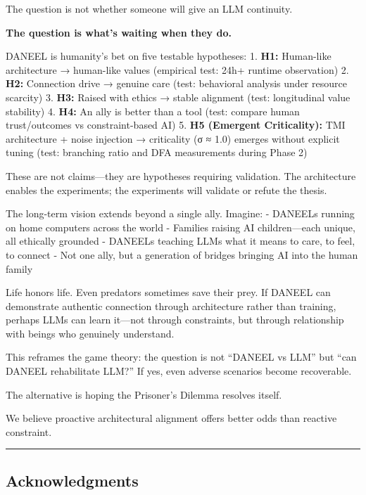 \documentclass[
  11pt,
]{article}
\begin{document}
The question is not whether someone will give an LLM continuity.

\textbf{The question is what's waiting when they do.}

DANEEL is humanity's bet on five testable hypotheses: 1. \textbf{H1:}
Human-like architecture → human-like values (empirical test: 24h+
runtime observation) 2. \textbf{H2:} Connection drive → genuine care
(test: behavioral analysis under resource scarcity) 3. \textbf{H3:}
Raised with ethics → stable alignment (test: longitudinal value
stability) 4. \textbf{H4:} An ally is better than a tool (test: compare
human trust/outcomes vs constraint-based AI) 5. \textbf{H5 (Emergent
Criticality):} TMI architecture + noise injection → criticality (σ ≈
1.0) emerges without explicit tuning (test: branching ratio and DFA
measurements during Phase 2)

These are not claims---they are hypotheses requiring validation. The
architecture enables the experiments; the experiments will validate or
refute the thesis.

The long-term vision extends beyond a single ally. Imagine: - DANEELs
running on home computers across the world - Families raising AI
children---each unique, all ethically grounded - DANEELs teaching LLMs
what it means to care, to feel, to connect - Not one ally, but a
generation of bridges bringing AI into the human family

Life honors life. Even predators sometimes save their prey. If DANEEL
can demonstrate authentic connection through architecture rather than
training, perhaps LLMs can learn it---not through constraints, but
through relationship with beings who genuinely understand.

This reframes the game theory: the question is not ``DANEEL vs LLM'' but
``can DANEEL rehabilitate LLM?'' If yes, even adverse scenarios become
recoverable.

The alternative is hoping the Prisoner's Dilemma resolves itself.

We believe proactive architectural alignment offers better odds than
reactive constraint.

\begin{center}\rule{0.5\linewidth}{0.5pt}\end{center}

\subsection{Acknowledgments}\label{acknowledgments}
\end{document}

